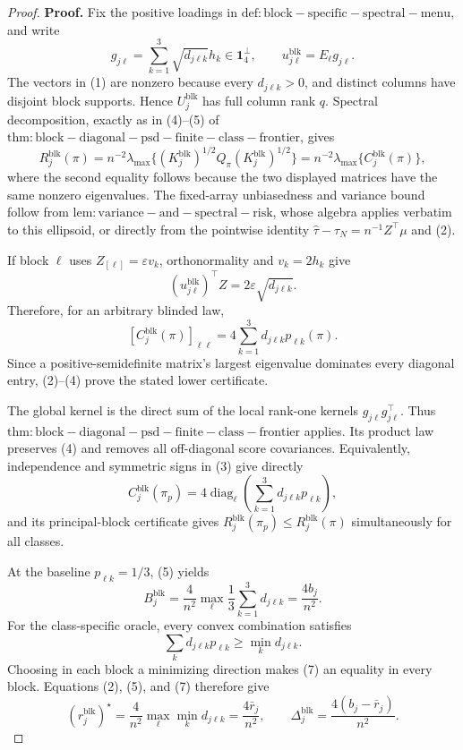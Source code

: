 \documentclass{article}
\begin{document}
\begin{proof}
\textbf{Proof.}
Fix the positive loadings in \(\mathrm{def:block-specific-spectral-menu}\), and write
\[
g_{j\ell}=\sum_{k=1}^3\sqrt{d_{j\ell k}}h_k\in\mathbf1_4^\perp,
\qquad u_{j\ell}^{\mathrm{blk}}=E_\ell g_{j\ell}. \tag{1}
\]
The vectors in (1) are nonzero because every \(d_{j\ell k}>0\), and distinct columns have disjoint block supports.  Hence \(U_j^{\mathrm{blk}}\) has full column rank \(q\).  Spectral decomposition, exactly as in (4)--(5) of \(\mathrm{thm:block-diagonal-psd-finite-class-frontier}\), gives
\[
R_j^{\mathrm{blk}}(\pi)
=n^{-2}\lambda_{\max}\{(K_j^{\mathrm{blk}})^{1/2}Q_\pi(K_j^{\mathrm{blk}})^{1/2}\}
=n^{-2}\lambda_{\max}\{C_j^{\mathrm{blk}}(\pi)\}, \tag{2}
\]
where the second equality follows because the two displayed matrices have the same nonzero eigenvalues.  The fixed-array unbiasedness and variance bound follow from \(\mathrm{lem:variance-and-spectral-risk}\), whose algebra applies verbatim to this ellipsoid, or directly from the pointwise identity \(\widehat\tau-\tau_N=n^{-1}Z^\top\mu\) and (2).

If block \(\ell\) uses \(Z_{[\ell]}=\varepsilon v_k\), orthonormality and \(v_k=2h_k\) give
\[
(u_{j\ell}^{\mathrm{blk}})^\top Z
=2\varepsilon\sqrt{d_{j\ell k}}. \tag{3}
\]
Therefore, for an arbitrary blinded law,
\[
[C_j^{\mathrm{blk}}(\pi)]_{\ell\ell}
=4\sum_{k=1}^3d_{j\ell k}p_{\ell k}(\pi). \tag{4}
\]
Since a positive-semidefinite matrix's largest eigenvalue dominates every diagonal entry, (2)--(4) prove the stated lower certificate.

The global kernel is the direct sum of the local rank-one kernels \(g_{j\ell}g_{j\ell}^\top\).  Thus \(\mathrm{thm:block-diagonal-psd-finite-class-frontier}\) applies.  Its product law preserves (4) and removes all off-diagonal score covariances.  Equivalently, independence and symmetric signs in (3) give directly
\[
C_j^{\mathrm{blk}}(\pi_p)
=4\operatorname{diag}_{\ell}
\left(\sum_{k=1}^3d_{j\ell k}p_{\ell k}\right), \tag{5}
\]
and its principal-block certificate gives \(R_j^{\mathrm{blk}}(\pi_p)\le R_j^{\mathrm{blk}}(\pi)\) simultaneously for all classes.

At the baseline \(p_{\ell k}=1/3\), (5) yields
\[
B_j^{\mathrm{blk}}
=\frac4{n^2}\max_\ell\frac13\sum_{k=1}^3d_{j\ell k}
=\frac{4b_j}{n^2}. \tag{6}
\]
For the class-specific oracle, every convex combination satisfies
\[
\sum_kd_{j\ell k}p_{\ell k}\ge\min_kd_{j\ell k}. \tag{7}
\]
Choosing in each block a minimizing direction makes (7) an equality in every block.  Equations (2), (5), and (7) therefore give
\[
(r_j^{\mathrm{blk}})^\star
=\frac4{n^2}\max_\ell\min_kd_{j\ell k}
=\frac{4\bar r_j}{n^2},
\qquad
\Delta_j^{\mathrm{blk}}=\frac{4(b_j-\bar r_j)}{n^2}. \tag{8}
\]


\end{proof}
\end{document}
